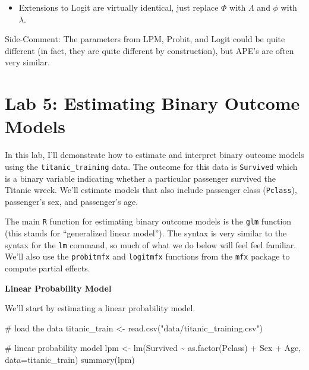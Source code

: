 \documentclass[
  letterpaper,
  DIV=11,
  numbers=noendperiod]{scrreprt}
\newenvironment{Shaded}{\begin{snugshade}}{\end{snugshade}}
\newcommand{\AttributeTok}[1]{\textcolor[rgb]{0.40,0.45,0.13}{#1}}
\newcommand{\CommentTok}[1]{\textcolor[rgb]{0.37,0.37,0.37}{#1}}
\newcommand{\FunctionTok}[1]{\textcolor[rgb]{0.28,0.35,0.67}{#1}}
\newcommand{\NormalTok}[1]{\textcolor[rgb]{0.00,0.23,0.31}{#1}}
\newcommand{\OtherTok}[1]{\textcolor[rgb]{0.00,0.23,0.31}{#1}}
\newcommand{\SpecialCharTok}[1]{\textcolor[rgb]{0.37,0.37,0.37}{#1}}
\newcommand{\StringTok}[1]{\textcolor[rgb]{0.13,0.47,0.30}{#1}}
\providecommand{\tightlist}{%
  \setlength{\itemsep}{0pt}\setlength{\parskip}{0pt}}\usepackage{longtable,booktabs,array}
\begin{document}
\begin{itemize}
\tightlist
\item
  Extensions to Logit are virtually identical, just replace \(\Phi\)
  with \(\Lambda\) and \(\phi\) with \(\lambda\).
\end{itemize}

{Side-Comment:} The parameters from LPM, Probit, and Logit could be
quite different (in fact, they are quite different by construction), but
APE's are often very similar.

\section{Lab 5: Estimating Binary Outcome
Models}\label{lab-5-estimating-binary-outcome-models}

In this lab, I'll demonstrate how to estimate and interpret binary
outcome models using the \texttt{titanic\_training} data. The outcome
for this data is \texttt{Survived} which is a binary variable indicating
whether a particular passenger survived the Titanic wreck. We'll
estimate models that also include passenger class (\texttt{Pclass}),
passenger's sex, and passenger's age.

The main \texttt{R} function for estimating binary outcome models is the
\texttt{glm} function (this stands for ``generalized linear model'').
The syntax is very similar to the syntax for the \texttt{lm} command, so
much of what we do below will feel feel familiar. We'll also use the
\texttt{probitmfx} and \texttt{logitmfx} functions from the \texttt{mfx}
package to compute partial effects.

\textbf{Linear Probability Model}

We'll start by estimating a linear probability model.

\begin{Shaded}
\begin{Highlighting}[]
\CommentTok{\# load the data}
\NormalTok{titanic\_train }\OtherTok{\textless{}{-}} \FunctionTok{read.csv}\NormalTok{(}\StringTok{"data/titanic\_training.csv"}\NormalTok{)}

\CommentTok{\# linear probability model}
\NormalTok{lpm }\OtherTok{\textless{}{-}} \FunctionTok{lm}\NormalTok{(Survived }\SpecialCharTok{\textasciitilde{}} \FunctionTok{as.factor}\NormalTok{(Pclass) }\SpecialCharTok{+} 
\NormalTok{            Sex }\SpecialCharTok{+}\NormalTok{ Age, }
          \AttributeTok{data=}\NormalTok{titanic\_train)}
\FunctionTok{summary}\NormalTok{(lpm)}
\end{Highlighting}
\end{Shaded}
\end{document}
